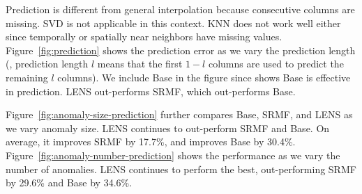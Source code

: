  Prediction is different from general interpolation
because consecutive columns are missing. SVD is not applicable in this
context. KNN does not work well either since temporally or spatially
near neighbors have missing values. Figure~\ref{fig:prediction} shows
the prediction error as we vary the prediction length (\ie, prediction
length $l$ means that the first $1-l$ columns are used to predict the
remaining $l$ columns). We include Base in the figure since
\cite{zhang09sensing} shows Base is effective in prediction. LENS
out-performs SRMF, which out-performs Base. %

Figure~\ref{fig:anomaly-size-prediction} further compares Base, SRMF,
and LENS as we vary anomaly size. LENS continues to out-perform SRMF
and Base. On average, it improves SRMF by 17.7\%, and improves Base by
30.4\%. 
Figure~\ref{fig:anomaly-number-prediction} shows the performance as we
vary the number of anomalies. LENS continues to perform the best,
out-performing SRMF by 29.6\% and Base by 34.6\%. 


